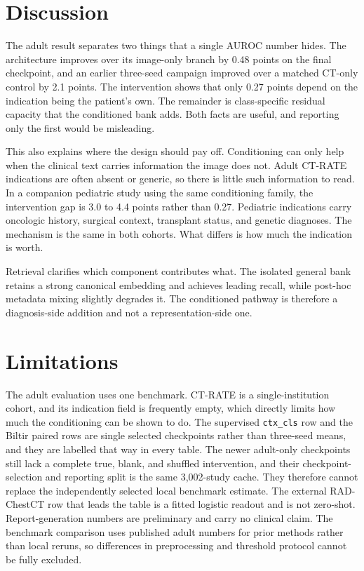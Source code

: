 \documentclass[10pt,twocolumn]{article}
\begin{document}
\section{Discussion}
The adult result separates two things that a single AUROC number hides. The
architecture improves over its image-only branch by 0.48 points on the final
checkpoint, and an earlier three-seed campaign improved over a matched CT-only
control by 2.1 points. The intervention shows that only 0.27 points depend on
the indication being the patient's own.
The remainder is class-specific residual capacity that the conditioned bank
adds. Both facts are useful, and reporting only the first would be misleading.

This also explains where the design should pay off. Conditioning can only help
when the clinical text carries information the image does not. Adult CT-RATE
indications are often absent or generic, so there is little such information
to read. In a companion pediatric study using the same conditioning family, the
intervention gap is 3.0 to 4.4 points rather than 0.27. Pediatric
indications carry oncologic history, surgical context, transplant status, and
genetic diagnoses. The mechanism is the same in both cohorts. What differs is
how much the indication is worth.

Retrieval clarifies which component contributes what. The isolated general
bank retains a strong canonical embedding and achieves leading recall, while
post-hoc metadata mixing slightly degrades it. The conditioned pathway is
therefore a diagnosis-side addition and not a representation-side one.

\section{Limitations}
The adult evaluation uses one benchmark. CT-RATE is a single-institution
cohort, and its indication field is frequently empty, which directly limits
how much the conditioning can be shown to do. The supervised \texttt{ctx\_cls}
row and the Biltir paired rows are single selected checkpoints rather than
three-seed means, and they are labelled that way in every table. The newer
adult-only checkpoints still lack a complete true, blank, and shuffled
intervention, and their checkpoint-selection and reporting split is the same
3,002-study cache. They therefore cannot replace the independently selected
local benchmark estimate. The external RAD-ChestCT row that leads the table is a fitted
logistic readout and is not zero-shot. Report-generation numbers are
preliminary and carry no clinical claim. The benchmark comparison uses
published adult numbers for prior methods rather than local reruns, so
differences in preprocessing and threshold protocol cannot be fully excluded.
\end{document}
